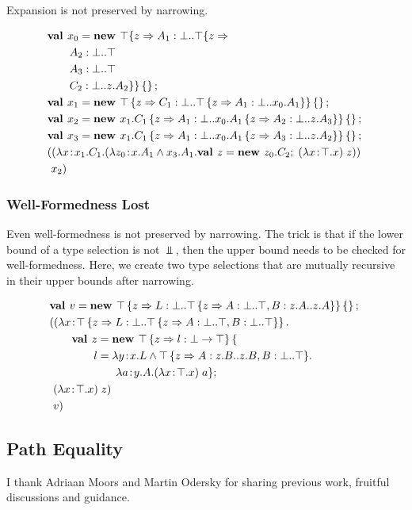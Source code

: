 \documentclass[preprint]{sigplanconf}
\begin{document}
Expansion is not preserved by narrowing.

\begin{align*}
&\textbf{val }x_0 = \textbf{new }\top \{z \Rightarrow  A_1 : \bot..\top \{z \Rightarrow \\
&\quad\quad A_2 : \bot..\top\\
&\quad\quad A_3 : \bot..\top\\
&\quad\quad C_2 : \bot..z.A_2 \} \}\left\{\right\} ;\;\\&
\textbf{val }x_1 = \textbf{new }\top \left\{z \Rightarrow C_1 : \bot..\top \left\{z \Rightarrow A_1 : \bot..x_0.A_1 \right\} \right\}\left\{\right\} ;\;\\&
\textbf{val }x_2 = \textbf{new }{x_1.C_1} \left\{z \Rightarrow A_1 : \bot..{x_0.A_1} \left\{z \Rightarrow A_2 : \bot..z.A_3 \right\} \right\}\left\{\right\} ;\;\\&
\textbf{val }x_3 = \textbf{new }{x_1.C_1} \left\{z \Rightarrow A_1 : \bot..{x_0.A_1} \left\{z \Rightarrow A_3 : \bot..z.A_2 \right\} \right\}\left\{\right\} ;\;\\&
((\lambda x\!:\!x_1.C_1.(\lambda z_0\!:\!x.A_1 \wedge x_3.A_1.\textbf{val }z = \textbf{new }z_0.C_2 ;\; (\lambda x\!:\!\top.x)\;z))\;\\&\ x_2)
\end{align*}

\subsubsection{Well-Formedness Lost}\label{narrowing_wf}

Even well-formedness is not preserved by narrowing. The trick is that
if the lower bound of a type selection is not $\Bot$, then the upper
bound needs to be checked for well-formedness. Here, we create two
type selections that are mutually recursive in their upper bounds
after narrowing.

\begin{align*}
&\mlnew v {\Top \refine z {\Ldecl L \Bot {\Top \refine z {\Ldecl A \Bot \Top, \Ldecl B {z.A} {z.A}}}} \ldefs{}}{
\mlapp {\abs x {\Top \refine z {\Ldecl L \Bot {\Top \refine z {\Ldecl A \Bot \Top, \Ldecl B \Bot \Top}}}} {\\&\gap
\mlnew z {\Top \refine z {\ldecl l {\Bot \tfun \Top}}\mlldefs{\\&\gap\gap l = \abs y {x.L \tand {\Top \refine z {\Ldecl A {z.B} {z.B}, \Ldecl B \Bot \Top}}} {\\&\gap\gap\gap\abs a {y.A} {\app {(\abs x \Top x)} a}}}}{
\ \app {(\abs x \Top x)} z
}}}{\ v}}
\end{align*}

\subsection{Path Equality}\label{patheq}

\acks

I thank Adriaan Moors and Martin Odersky for sharing previous work,
fruitful discussions and guidance.

%
%
\end{document}
